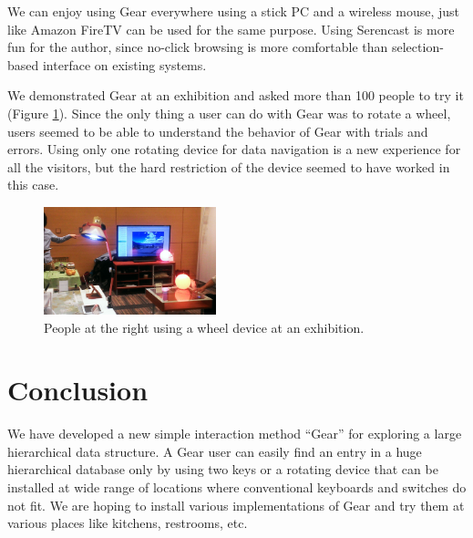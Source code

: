 \documentclass[conference]{IEEEtran}
\def\SC{Serencast}
\begin{document}
We can enjoy using Gear everywhere using a stick PC and a wireless mouse,
just like Amazon FireTV can be used for the same purpose.
Using {\SC} is more fun for the author, since no-click browsing is more comfortable than
selection-based interface on existing systems.

We demonstrated Gear at an exhibition
and asked more than 100 people to try it
(Figure \ref{exhibition}).
%
Since the only thing a user can do with Gear was to rotate a wheel,
users seemed to be able to understand the behavior of Gear with trials and errors.
% 
% 
Using only one rotating device for data navigation is a new experience for
all the visitors, but the hard restriction of the device seemed to have worked in this case.

\begin{figure}[H]
\centerline{\includegraphics[width=50mm,bb=0 0 527 329]{figures/c520d5dfbd06c532d48d324a7019b00c.png}}
\caption{People at the right using a wheel device at an exhibition.}
\label{exhibition}
\end{figure}


\section{Conclusion}

We have developed a new simple interaction method ``Gear'' for exploring
a large hierarchical data structure.
A Gear user can easily find an entry in a huge hierarchical database
only by using two keys or a rotating device that can be installed at
wide range of locations where conventional keyboards and switches do not fit.
We are hoping to install various implementations of Gear and try them at
various places like kitchens, restrooms, etc.

\small{


}
\end{document}

